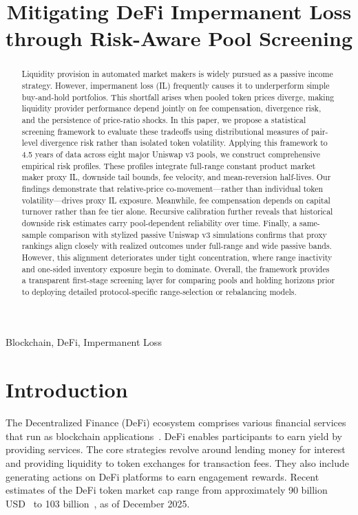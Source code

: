 \documentclass[10pt,conference,compsocconf]{IEEEtran}
\title{Mitigating DeFi Impermanent Loss through Risk-Aware Pool Screening}
\author{
\IEEEauthorblockN{Arad Kotzer and Ori Rottenstreich}
\IEEEauthorblockA{
Technion %
}
}
\begin{document}
\maketitle

\begin{abstract}
Liquidity provision in automated market makers is widely pursued as a passive income strategy. However, impermanent loss (IL) frequently causes it to underperform simple buy-and-hold portfolios. This shortfall arises when pooled token prices diverge, making liquidity provider performance depend jointly on fee compensation, divergence risk, and the persistence of price-ratio shocks. In this paper, we propose a statistical screening framework to evaluate these tradeoffs using distributional measures of pair-level divergence risk rather than isolated token volatility. Applying this framework to 4.5 years of data across eight major Uniswap v3 pools, we construct comprehensive empirical risk profiles. These profiles integrate full-range constant product market maker proxy IL, downside tail bounds, fee velocity, and mean-reversion half-lives. Our findings demonstrate that relative-price co-movement—rather than individual token volatility—drives proxy IL exposure. Meanwhile, fee compensation depends on capital turnover rather than fee tier alone. Recursive calibration further reveals that historical downside risk estimates carry pool-dependent reliability over time. Finally, a same-sample comparison with stylized passive Uniswap v3 simulations confirms that proxy rankings align closely with realized outcomes under full-range and wide passive bands. However, this alignment deteriorates under tight concentration, where range inactivity and one-sided inventory exposure begin to dominate. Overall, the framework provides a transparent first-stage screening layer for comparing pools and holding horizons prior to deploying detailed protocol-specific range-selection or rebalancing models.
\end{abstract}


\begin{IEEEkeywords}
Blockchain, DeFi, Impermanent Loss
\end{IEEEkeywords}


\section{Introduction}

The Decentralized Finance (DeFi) ecosystem comprises various financial services that run as blockchain applications~\cite{schar2021decentralized, zetzsche2020decentralized, jensen2021introduction, Bitcoin, wood2014ethereum}. DeFi enables participants to earn yield by providing services. The core strategies revolve around lending money for interest and providing liquidity to token exchanges for transaction fees. They also include generating actions on DeFi platforms to earn engagement rewards. Recent estimates of the DeFi token market cap range from approximately 90 billion USD~\cite{forbes2025defi} to 103 billion~\cite{coingecko2025defi}, as of December 2025.
\end{document}
